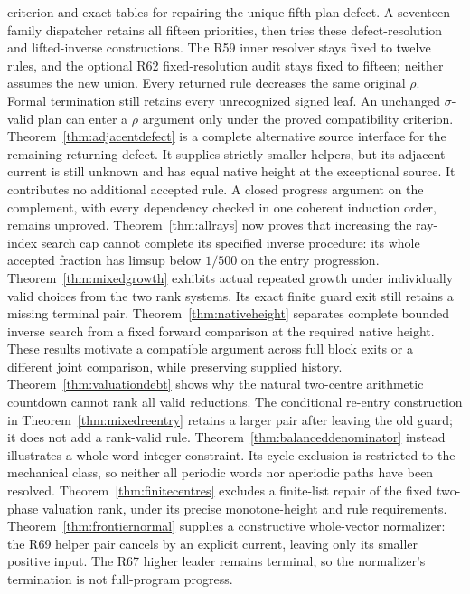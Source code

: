 \documentclass[11pt]{article}
\begin{document}
criterion and exact tables for repairing the unique fifth-plan defect.
A seventeen-family dispatcher retains all fifteen priorities, then tries
these defect-resolution and lifted-inverse constructions. The R59 inner
resolver stays fixed to twelve rules, and the optional R62 fixed-resolution
audit stays fixed to fifteen; neither assumes the new union.
Every returned rule decreases the same original $\rho$. Formal termination
still retains every unrecognized signed leaf. An unchanged $\sigma$-valid plan can enter
a $\rho$ argument only under the proved compatibility criterion.
Theorem~\ref{thm:adjacentdefect} is a complete alternative source interface
for the remaining returning defect. It supplies strictly smaller helpers,
but its adjacent current is still unknown and has equal native height
at the exceptional source. It contributes no additional accepted rule.
A closed progress argument on the complement, with every dependency
checked in one coherent induction order, remains unproved.
Theorem~\ref{thm:allrays} now proves that increasing the ray-index
search cap cannot complete its specified inverse procedure: its whole
accepted fraction has limsup below $1/500$ on the entry progression.
Theorem~\ref{thm:mixedgrowth} exhibits actual repeated growth under
individually valid choices from the two rank systems. Its exact finite
guard exit still retains a missing terminal pair.
Theorem~\ref{thm:nativeheight} separates complete bounded inverse
search from a fixed forward comparison at the required native height.
These results motivate a compatible argument across full block exits
or a different joint comparison, while preserving supplied history.
Theorem~\ref{thm:valuationdebt} shows why the natural two-centre
arithmetic countdown cannot rank all valid reductions. The conditional
re-entry construction in Theorem~\ref{thm:mixedreentry} retains a larger pair after leaving the old
guard; it does not add a rank-valid rule. Theorem~\ref{thm:balanceddenominator}
instead illustrates a whole-word integer constraint. Its cycle exclusion
is restricted to the mechanical class, so neither all periodic words nor
aperiodic paths have been resolved.
Theorem~\ref{thm:finitecentres} excludes a finite-list repair of the fixed
two-phase valuation rank, under its precise monotone-height and rule
requirements. Theorem~\ref{thm:frontiernormal} supplies a constructive
whole-vector normalizer: the R69 helper pair cancels by an explicit current,
leaving only its smaller positive input. The R67 higher leader remains
terminal, so the normalizer's termination is not full-program progress.
\end{document}
